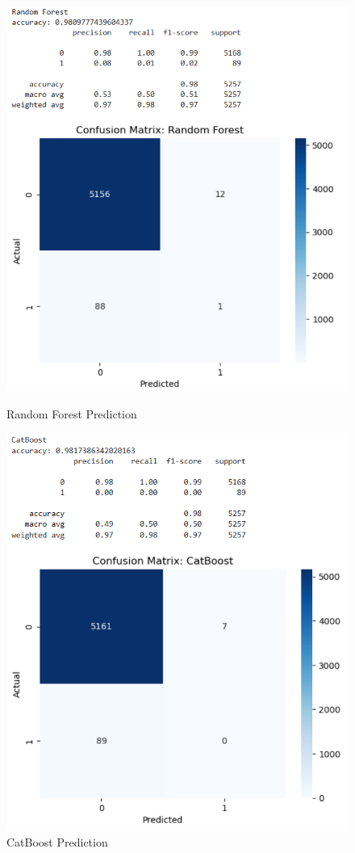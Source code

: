 \documentclass{article}
\begin{document}
\begin{figure}[h!]
	\begin{minipage}{0.48\textwidth}
		\centering
		\includegraphics[width=0.6\linewidth]{../Image/P18.jpg}
		\caption{Random Forest Prediction}
		\label{fig:P18}
	\end{minipage}\hfill
	\begin{minipage}{0.48\textwidth}
		\centering
		\includegraphics[width=0.6\linewidth]{../Image/P19.jpg}
		\caption{CatBoost Prediction}
		\label{fig:P19}
	\end{minipage}
\end{figure}
\end{document}
